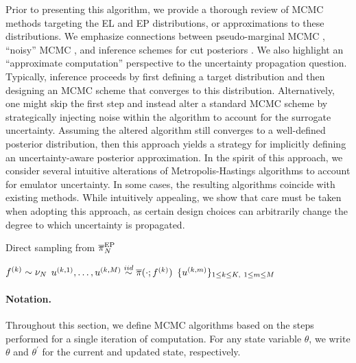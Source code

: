 \documentclass[12pt]{article}
\begin{document}
Prior to presenting this algorithm, we provide a thorough review of MCMC methods
targeting the EL and EP distributions, or approximations to these distributions. 
We emphasize connections between pseudo-marginal MCMC \citep{pseudoMarginalMCMC}, 
``noisy'' MCMC \citep{noisyMCMC}, and inference schemes for cut 
posteriors \citep{PlummerCut}. We also highlight an ``approximate computation'' 
perspective to the uncertainty propagation question. Typically, inference proceeds
by first defining a target distribution and then designing an MCMC scheme that
converges to this distribution. Alternatively, one might skip the first step and instead 
alter a standard MCMC scheme by strategically injecting noise within the 
algorithm to account for the surrogate uncertainty. Assuming the altered algorithm 
still converges to a well-defined posterior distribution, then this approach yields 
a strategy for implicitly defining an uncertainty-aware posterior approximation.
In the spirit of this approach, we consider several intuitive alterations of Metropolis-Hastings
algorithms to account for emulator uncertainty. In some cases, the resulting algorithms
coincide with existing methods. While intuitively appealing, we show that care must 
be taken when adopting this approach, as certain design choices can arbitrarily change the 
degree to which uncertainty is propagated.

\begin{algorithm}
    \caption{Direct sampling from $\overline{\pi}_{N}^{\mathrm{EP}}$}
    \label{alg:ep}
    \begin{algorithmic}[1]
        		\State $f^{(k)} \sim \nu_{N}$ 
		\State $u^{(k, 1)}, \dots, u^{(k, M)} \overset{iid}{\sim} \overline{\pi}(\cdot; f^{(k)})$ 
	\EndFor
	\State \Return $\{u^{(k, m)}\}_{1 \leq k \leq K, \ 1 \leq m \leq M}$
	\EndFunction
    \end{algorithmic}
\end{algorithm}

\paragraph{Notation.} Throughout this section, we define MCMC algorithms
based on the steps performed for a single iteration of computation. For any 
state variable $\theta$, we write $\theta$ and $\theta^\prime$ for the current
and updated state, respectively.
\end{document}
